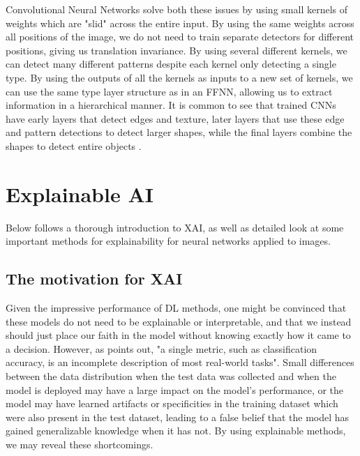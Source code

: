 \documentclass[UKenglish]{uiomasterthesis} %
\theoremstyle{definition}
\begin{document}
Convolutional Neural Networks solve both these issues by using small kernels of weights which are "slid" across the entire input. By using the same weights across all positions of the image, we do not need to train separate detectors for different positions, giving us translation invariance. By using several different kernels, we can detect many different patterns despite each kernel only detecting a single type. By using the outputs of all the kernels as inputs to a new set of kernels, we can use the same type layer structure as in an FFNN, allowing us to extract information in a hierarchical manner. It is common to see that trained CNNs have early layers that detect edges and texture, later layers that use these edge and pattern detections to detect larger shapes, while the final layers combine the shapes to detect entire objects \cite{lenet5}.

\section{Explainable AI} \label{xai_intro}

Below follows a thorough introduction to XAI, as well as detailed look at some important methods for explainability for neural networks applied to images.

\subsection{The motivation for XAI}

Given the impressive performance of DL methods, one might be convinced that these models do not need to be explainable or interpretable, and that we instead should just place our faith in the model without knowing exactly how it came to a decision. However, as \cite{doshivelez} points out, "a single metric, such as classification accuracy, is an incomplete description of most real-world tasks". Small differences between the data distribution when the test data was collected and when the model is deployed may have a large impact on the model's performance, or the model may have learned artifacts or specificities in the training dataset which were also present in the test dataset, leading to a false belief that the model has gained generalizable knowledge when it has not. By using explainable methods, we may reveal these shortcomings.
\end{document}
